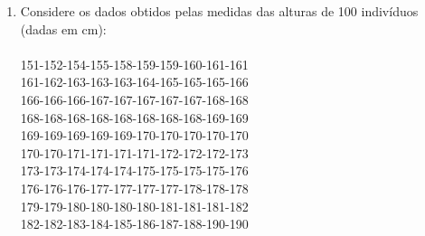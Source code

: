 \documentclass[a4paper, 12pt]{article}
\begin{document}
\begin{enumerate}
\item Considere os dados obtidos pelas medidas das alturas de 100 indivíduos (dadas em cm):\\\\
  151-152-154-155-158-159-159-160-161-161 \\
  161-162-163-163-163-164-165-165-165-166 \\
  166-166-166-167-167-167-167-167-168-168 \\
  168-168-168-168-168-168-168-168-169-169 \\
  169-169-169-169-169-170-170-170-170-170 \\
  170-170-171-171-171-171-172-172-172-173 \\
  173-173-174-174-174-175-175-175-175-176 \\
  176-176-176-177-177-177-177-178-178-178 \\
  179-179-180-180-180-180-181-181-181-182 \\
  182-182-183-184-185-186-187-188-190-190 \\\\


\end{enumerate}
\end{document}
